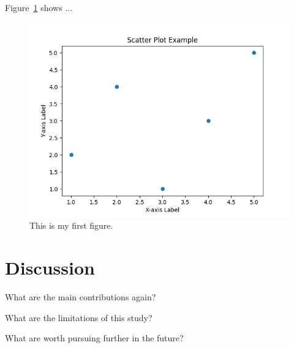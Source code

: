 \documentclass[12pt]{article}
\begin{document}
Figure~\ref{fig:myfig} shows ...


\begin{figure}[tbp]
  \centering
  \includegraphics[width=\textwidth]{myfigure.png}
  \caption{This is my first figure.}
  \label{fig:myfig}
\end{figure}

\section{Discussion}
\label{sec:disc}

What are the main contributions again?

What are the limitations of this study?

What are worth pursuing further in the future?

\lipsum[1-2]



 
\end{document}
